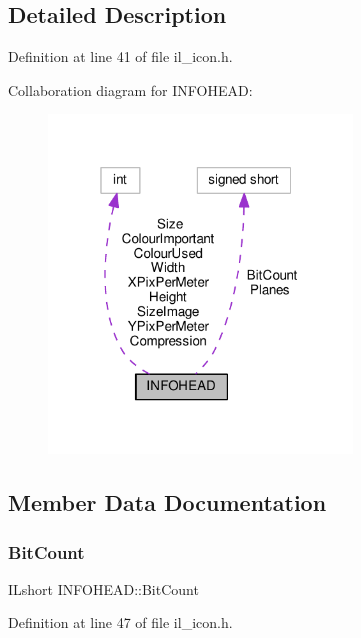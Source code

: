 \subsection{Detailed Description}


Definition at line 41 of file il\+\_\+icon.\+h.



Collaboration diagram for I\+N\+F\+O\+H\+E\+AD\+:
\nopagebreak
\begin{figure}[H]
\begin{center}
\leavevmode
\includegraphics[width=229pt]{d1/d72/structINFOHEAD__coll__graph}
\end{center}
\end{figure}


\subsection{Member Data Documentation}
\mbox{\label{structINFOHEAD_aedc887ac8b2801f8ff27a94da1142656}} 
\subsubsection{\texorpdfstring{Bit\+Count}{BitCount}}
{\footnotesize\ttfamily I\+Lshort I\+N\+F\+O\+H\+E\+A\+D\+::\+Bit\+Count}



Definition at line 47 of file il\+\_\+icon.\+h.

\mbox{\label{structINFOHEAD_ad831abe6b03a339eb720b7ab560b0f9b}} 
